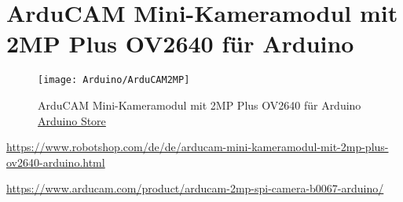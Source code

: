 %
%



\section{ArduCAM Mini-Kameramodul mit 2MP Plus OV2640 für Arduino}


\begin{figure}
	\centering
  \texttt{[image: Arduino/ArduCAM2MP]}
\caption{ArduCAM Mini-Kameramodul mit 2MP Plus OV2640 für Arduino \href{https://store.arduino.cc/portenta-h7}{Arduino Store}}
\end{figure}


\url{https://www.robotshop.com/de/de/arducam-mini-kameramodul-mit-2mp-plus-ov2640-arduino.html}

\url{https://www.arducam.com/product/arducam-2mp-spi-camera-b0067-arduino/}

